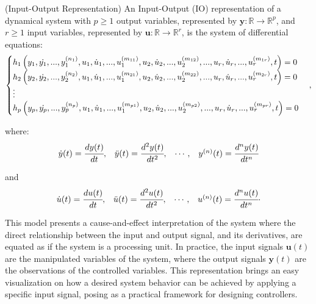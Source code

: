 \documentclass[a4paper,11pt]{book}
\numberwithin{figure}{chapter}
\numberwithin{equation}{chapter}
\numberwithin{table}{chapter}
\theoremstyle{definition}
\newtheorem{definition}{Definition}[chapter]
\newcounter{boxed-theorem}
\newcounter{boxed-lemma}
\newcounter{boxed-definition}
\newenvironment{boxed-definition}[1]
{\colorlet{shadecolor}{pastelYellow!15} \begin{shaded} \begin{definition}{#1}}
{\end{definition} \end{shaded}}
\newcounter{boxed-example}
\begin{document}
\begin{boxed-definition}{(Input-Output Representation)} \label{def:IORepr01}
    An Input-Output (IO) representation of a dynamical system with $p \geq 1$ output variables, represented by $\bm{y} : \mathbb{R} \rightarrow \mathbb{R}^{p}$, and $r \geq 1$ input variables, represented by $\bm{u} : \mathbb{R} \rightarrow \mathbb{R}^{r}$, is the system of differential equations:
    \begin{equation} \label{eq:IERepr01}
    \begin{cases}
        h_1 \left( y_1, \dot{y_1}, ..., y_1^{(n_1)}, u_1, \dot{u}_1, ..., u^{(m_{11})}_1, u_2, \dot{u}_2, ..., u^{(m_{12})}_2, ..., u_r, \dot{u}_r, ..., u^{(m_{1r})}_r, t   \right) = 0 & \\
        h_2 \left( y_2, \dot{y_2}, ..., y_2^{(n_2)}, u_1, \dot{u}_1, ..., u^{(m_{21})}_1, u_2, \dot{u}_2, ..., u^{(m_{22})}_2, ..., u_r, \dot{u}_r, ..., u^{(m_{2r})}_r, t   \right) = 0 & \\
         \vdots \hfill & \\
        h_p \left( y_p, \dot{y_p}, ..., y_p^{(n_p)}, u_1, \dot{u}_1, ..., u^{(m_{p1})}_1, u_2, \dot{u}_2, ..., u^{(m_{p2})}_2, ..., u_r, \dot{u}_r, ..., u^{(m_{pr})}_r, t   \right) = 0 &
    \end{cases}
    ,\end{equation}
    
    \noindent where:
    \begin{equation*}
    \begin{matrix}
        \dot{y}(t) = \cfrac{d y(t)}{dt}, & \ddot{y}(t) = \cfrac{d^2 y(t)}{dt^2}, & \cdots, & y^{(n)}(t) = \cfrac{d^n y(t)}{dt^n}
    \end{matrix}
    \end{equation*}

	\noindent and    
    \begin{equation*}
    \begin{matrix}
        \dot{u}(t) = \cfrac{d u(t)}{dt}, & \ddot{u}(t) = \cfrac{d^2 u(t)}{dt^2}, & \cdots, & u^{(n)}(t) = \cfrac{d^n u(t)}{dt^n}
    \end{matrix}
    .\end{equation*}
\end{boxed-definition}

This model presents a cause-and-effect interpretation of the system where the direct relationship between the input and output signal, and its derivatives, are equated as if the system is a processing unit. In practice, the input signals $\bm{u}(t)$ are the manipulated variables of the system, where the output signals $\bm{y}(t)$ are the observations of the controlled variables. This representation brings an easy visualization on how a desired system behavior can be achieved by applying a specific input signal, posing as a practical framework for designing controllers. 
\end{document}
